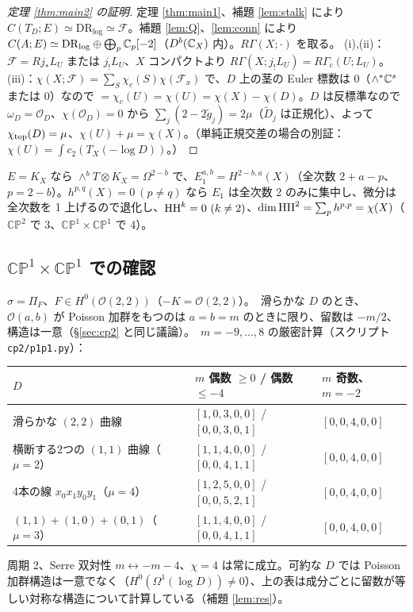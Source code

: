 \begin{proof}[定理 \ref{thm:main2} の証明]
定理 \ref{thm:main1}、補題 \ref{lem:stalk} により $C(T_D;E)\simeq\mathrm{DR}_{\log}\simeq\mathcal F$。補題 \ref{lem:Q}、\ref{lem:conn} により $C(A;E)\simeq\mathrm{DR}_{\log}\oplus\bigoplus_p\mathbb C_p[-2]$（$D^b(\mathbb C_X)$ 内）。$R\Gamma(X;\cdot)$ を取る。
(i),(ii)：$\mathcal F=Rj_*L_U$ または $j_!L_U$、$X$ コンパクトより $R\Gamma(X;j_!L_U)=R\Gamma_c(U;L_U)$。
(iii)：$\chi(X;\mathcal F)=\sum_S\chi_c(S)\chi(\mathcal F_x)$ で、$D$ 上の茎の Euler 標数は 0（$\wedge^*\mathbb C^s$ または 0）なので $=\chi_c(U)=\chi(U)=\chi(X)-\chi(D)$。$D$ は反標準なので $\omega_D=\mathcal O_D$、$\chi(\mathcal O_D)=0$ から $\sum_j(2-2\tilde g_j)=2\mu$（$\tilde D_j$ は正規化）、よって $\chi_{\rm top}(D)=\mu$、$\chi(U)+\mu=\chi(X)$。（単純正規交差の場合の別証：$\chi(U)=\int c_2(T_X(-\log D))$。）
\end{proof}
\begin{prop}[$r_i=1$：$E=K_X$]\tP\label{prop:K}
$E=K_X$ なら $\wedge^bT\otimes K_X=\Omega^{2-b}$ で、$E_1^{a,b}=H^{2-b,a}(X)$（全次数 $2+a-p$、$p=2-b$）。$h^{p,q}(X)=0\ (p\ne q)$ なら $E_1$ は全次数 2 のみに集中し、微分は全次数を 1 上げるので退化し、$\mathrm{HH}^k=0\ (k\ne2)$、$\dim\mathrm{HH}^2=\sum_ph^{p,p}=\chi(X)$（$\mathbb{CP}^2$ で 3、$\mathbb{CP}^1\times\mathbb{CP}^1$ で 4）。
\end{prop}

\subsection{$\mathbb{CP}^1\times\mathbb{CP}^1$ での確認}
$\sigma=\Pi_F$、$F\in H^0(\mathcal O(2,2))$（$-K=\mathcal O(2,2)$）。\tP\ 滑らかな $D$ のとき、$\mathcal O(a,b)$ が Poisson 加群をもつのは $a=b=m$ のときに限り、留数は $-m/2$、構造は一意（\S\ref{sec:cp2} と同じ議論）。\tV\ $m=-9,\dots,8$ の厳密計算（スクリプト \texttt{cp2/p1p1.py}）：
\begin{center}\small
\begin{tabular}{lll}\toprule
$D$ & $m$ 偶数 $\ge0$ / 偶数 $\le-4$ & $m$ 奇数、$m=-2$\\\midrule
滑らかな $(2,2)$ 曲線 & $[1,0,3,0,0]$ / $[0,0,3,0,1]$ & $[0,0,4,0,0]$\\
横断する2つの $(1,1)$ 曲線（$\mu=2$）& $[1,1,4,0,0]$ / $[0,0,4,1,1]$ & $[0,0,4,0,0]$\\
4本の線 $x_0x_1y_0y_1$（$\mu=4$）& $[1,2,5,0,0]$ / $[0,0,5,2,1]$ & $[0,0,4,0,0]$\\
$(1,1)+(1,0)+(0,1)$（$\mu=3$）& $[1,1,4,0,0]$ / $[0,0,4,1,1]$ & $[0,0,4,0,0]$\\\bottomrule
\end{tabular}
\end{center}
周期 2、Serre 双対性 $m\leftrightarrow-m-4$、$\chi=4$ は常に成立。可約な $D$ では Poisson 加群構造は一意でなく（$H^0(\Omega^1(\log D))\ne0$）、上の表は成分ごとに留数が等しい対称な構造について計算している（補題 \ref{lem:res}）。

